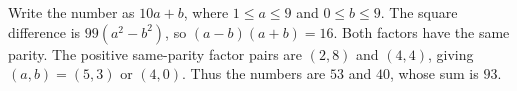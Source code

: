 Write the number as $10a+b$, where $1\le a\le9$ and $0\le b\le9$. The square difference is $99(a^2-b^2)$, so $(a-b)(a+b)=16$. Both factors have the same parity. The positive same-parity factor pairs are $(2,8)$ and $(4,4)$, giving $(a,b)=(5,3)$ or $(4,0)$. Thus the numbers are $53$ and $40$, whose sum is $\boxed{93}$.
